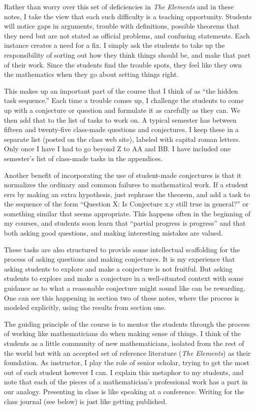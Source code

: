 \documentclass{tufte-handout}
\theoremstyle{definition}
\begin{document}
Rather than worry over this set of deficiencies in \emph{The Elements} and in these notes, I take the view that each such difficulty is a teaching opportunity. Students will notice gaps in arguments, trouble with definitions, possible theorems that they need but are not stated as official problems, and confusing statements. Each instance creates a need for a fix. I simply ask the students to take up the responsibility of sorting out how they think things should be, and make that part of their work. Since the students find the trouble spots, they feel like they own the mathematics when they go about setting things right.

This makes up an important part of the course that I think of as ``the hidden task sequence.'' Each time a trouble comes up, I challenge the students to come up with a conjecture or question and formulate it as carefully as they can. We then add that to the list of tasks to work on. A typical semester has between fifteen and twenty-five class-made questions and conjectures. I keep these in a separate list (posted on the class web site), labeled with capital roman letters. Only once I have I had to go beyond Z to AA and BB. I have included one semester's list of class-made tasks in the appendices.

Another benefit of incorporating the use of student-made conjectures is that it normalizes the ordinary and common failures to mathematical work. If a student errs by making an extra hypothesis, just rephrase the theorem, and add a task to the sequence of the form ``Question X: Is Conjecture x.y still true in general?'' or something similar that seems appropriate. This happens often in the beginning of my courses, and students soon learn that ``partial progress is progress'' and that both asking good questions, and making interesting mistakes are valued.

These tasks are also structured to provide some intellectual scaffolding for the process of asking questions and making conjectures. It is my experience that asking students to explore and make a conjecture is not fruitful. But asking students to explore and make a conjecture in a well-situated context with some guidance as to what a reasonable conjecture might sound like can be rewarding. One can see this happening in section two of these notes, where the process is modeled explicitly, using the results from section one.

The guiding principle of the course is to mentor the students through the process of working like mathematicians do when making sense of things. I think of the students as a little community of new mathematicians, isolated from the rest of the world but with an accepted set of reference literature (\emph{The Elements}) as their foundation. As instructor, I play the role of senior scholar, trying to get the most out of each student however I can. I explain this metaphor to my students, and note that each of the pieces of a mathematician's professional work has a part in our analogy. Presenting in class is like speaking at a conference. Writing for the class journal (see below) is just like getting published.
\end{document}
